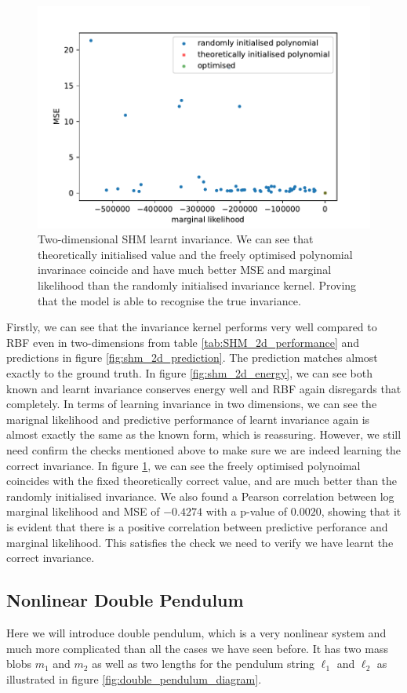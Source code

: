 \documentclass{statsmsc}
\begin{document}
\begin{figure}[H] 
  \includegraphics[width=0.8\linewidth]{../codes/figures/shm_2d_polynomial.pdf}
  \centering
  \caption{Two-dimensional SHM learnt invariance. We can see that theoretically initialised value and the freely optimised polynomial invarinace coincide and have much better MSE and marginal likelihood than the randomly initialised invariance kernel. Proving that the model is able to recognise the true invariance.}
  \label{fig:shm_2d_poly}
\end{figure}

Firstly, we can see that the invariance kernel performs very well compared to RBF even in two-dimensions from table \ref{tab:SHM_2d_performance} and predictions in figure \ref{fig:shm_2d_prediction}.
The prediction matches almost exactly to the ground truth.
In figure \ref{fig:shm_2d_energy}, we can see both known and learnt invariance conserves energy well and RBF again disregards that completely.
In terms of learning invariance in two dimensions, we can see the marignal likelihood and predictive performance of learnt invariance again is almost exactly the same as the known form, which is reassuring.
However, we still need confirm the checks mentioned above to make sure we are indeed learning the correct invariance.
In figure \ref{fig:shm_2d_poly}, we can see the freely optimised polynoimal coincides with the fixed theoretically correct value, and are much better than the randomly initialised invariance.
We also found a Pearson correlation between log marginal likelihood and MSE of $-0.4274$ with a p-value of $0.0020$, showing that it is evident that there is a positive correlation between predictive perforance and marginal likelihood.
This satisfies the check we need to verify we have learnt the correct invariance. 

\subsection{Nonlinear Double Pendulum}
Here we will introduce double pendulum, which is a very nonlinear system and much more complicated than all the cases we have seen before. 
It has two mass blobs $m_1$ and $m_2$ as well as two lengths for the pendulum string $\ell_1$ and $\ell_2$ as illustrated in figure \ref{fig:double_pendulum_diagram}.
\end{document}
